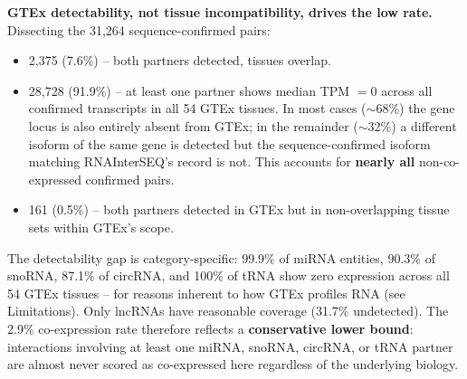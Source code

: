 \documentclass[11pt]{article}
\begin{document}
\begin{sloppypar}
\textbf{GTEx detectability, not tissue incompatibility, drives the low rate.}
Dissecting the 31,264 sequence-confirmed pairs:
\begin{itemize}
  \item 2,375 (7.6\%) -- both partners detected, tissues overlap.
  \item 28,728 (91.9\%) -- at least one partner shows
        median TPM $= 0$ across all confirmed transcripts in all 54 GTEx tissues.
        In most cases ($\sim$68\%) the gene locus is also entirely absent from GTEx;
        in the remainder ($\sim$32\%) a different isoform of the same gene is
        detected but the sequence-confirmed isoform matching RNAInterSEQ's record is not.
        This accounts for \textbf{nearly all} non-co-expressed confirmed pairs.
  \item 161 (0.5\%) -- both partners detected in GTEx but in
        non-overlapping tissue sets within GTEx's scope.
\end{itemize}
The detectability gap is category-specific: 99.9\% of miRNA entities, 90.3\%
of snoRNA, 87.1\% of circRNA, and 100\% of tRNA show zero expression across
all 54 GTEx tissues -- for reasons inherent to how GTEx profiles RNA (see
Limitations). Only lncRNAs have reasonable coverage (31.7\% undetected).
The 2.9\% co-expression rate therefore reflects a
\textbf{conservative lower bound}: interactions involving at least one
miRNA, snoRNA, circRNA, or tRNA partner are almost never scored as
co-expressed here regardless of the underlying biology.
\end{sloppypar}
\end{document}
